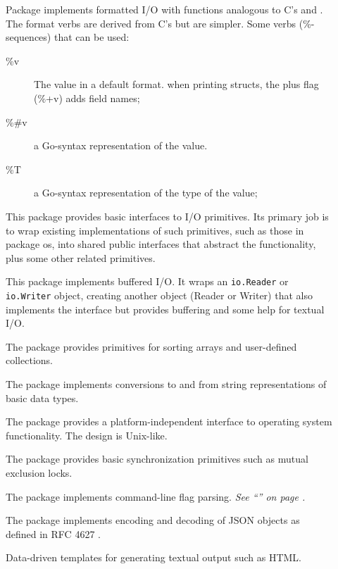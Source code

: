 \begin{description}
\item[]{
Package  implements formatted I/O with functions analogous
to C's  and . The format verbs are derived
from C's but are simpler. Some verbs (\%-sequences) that can be used:

\begin{description}
\item[\%v]{The value in a default format.
when printing structs, the plus flag (\%+v) adds field names;}
\item[\%\#v]{a Go-syntax representation of the value.}
\item[\%T]{a Go-syntax representation of the type of the value;}
\end{description}

}

\item[]{
This package provides basic interfaces to I/O primitives.
Its primary job is to wrap existing implementations of such primitives,
such as those in package os, into shared public interfaces that
abstract the functionality, plus some other related primitives.
}
\item[]{
This package implements buffered I/O.  It wraps an 
\lstinline{io.Reader}
or
\lstinline{io.Writer}
object, creating another object (Reader or Writer) that also implements
the interface but provides buffering and some help for textual I/O.
}
\item[]{
The  package provides primitives for sorting arrays
and user-defined collections.
}
\item[]{
The  package implements conversions to and from
string representations of basic data types.
}
\item[]{
The  package provides a platform-independent interface to operating
system functionality.  The design is Unix-like.
}
\item[]{
The package  provides basic synchronization primitives such as mutual
exclusion locks. 
}
\item[]{
The  package implements command-line flag parsing. 
\emph{See ``''
on page \pageref{sec:option parsing}.}
}
\item[]{
The  package implements encoding and decoding of JSON objects as
defined in RFC 4627 \cite{RFC4627}.
}
\item[]{
Data-driven templates for generating textual output such as HTML.

}
\end{description}
